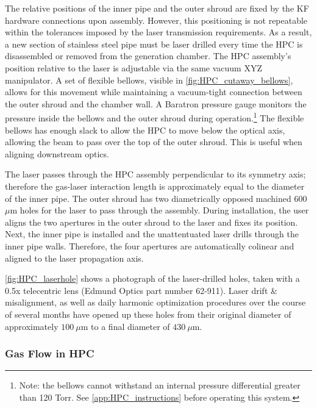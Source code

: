 The relative positions of the inner pipe and the outer shroud are fixed by the KF hardware connections upon assembly. However, this positioning is not repeatable within the tolerances imposed by the laser transmission requirements. As a result, a new section of stainless steel pipe must be laser drilled every time the HPC is disassembled or removed from the generation chamber. The HPC assembly's position relative to the laser is adjustable via the same vacuum XYZ manipulator. A set of flexible bellows, visible in \cref{fig:HPC_cutaway_bellows}, allows for this movement while maintaining a vacuum-tight connection between the outer shroud and the chamber wall. A Baratron pressure gauge monitors the pressure inside the bellows and the outer shroud during operation.\footnote{Note: the bellows cannot withstand an internal pressure differential greater than 120 Torr. See \cref{app:HPC_instructions} before operating this system.} The flexible bellows has enough slack to allow the HPC to move below the optical axis, allowing the beam to pass over the top of the outer shroud. This is useful when aligning downstream optics.

The laser passes through the HPC assembly perpendicular to its symmetry axis; therefore the gas-laser interaction length is approximately equal to the diameter of the inner pipe. The outer shroud has two diametrically opposed machined 600 $\mu$m holes for the laser to pass through the assembly. During installation, the user aligns the two apertures in the outer shroud to the laser and fixes its position. Next, the inner pipe is installed and the unattentuated laser drills through the inner pipe walls. Therefore, the four apertures are automatically colinear and aligned to the laser propagation axis.

\cref{fig:HPC_laserhole} shows a photograph of the laser-drilled holes, taken with a 0.5x telecentric lens (Edmund Optics part number 62-911). Laser drift \&  misalignment, as well as daily harmonic optimization procedures over the course of several months have opened up these holes from their original diameter of approximately $100 \ \mu \textrm{m}$ to a final diameter of $430 \ \mu \textrm{m}$.

\subsubsection{Gas Flow in HPC}

